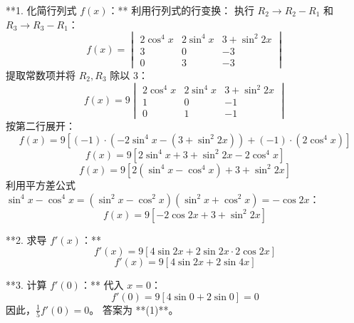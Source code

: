 \begin{questions}
\begin{solution}
**1. 化简行列式 $f(x)$：**
利用行列式的行变换：
执行 $R_2 \to R_2 - R_1$ 和 $R_3 \to R_3 - R_1$：
\[ f(x) = \begin{vmatrix} 2 \cos^4 x & 2 \sin^4 x & 3 + \sin^2 2x \\ 3 & 0 & -3 \\ 0 & 3 & -3 \end{vmatrix} \]
提取常数项并将 $R_2, R_3$ 除以 3：
\[ f(x) = 9 \begin{vmatrix} 2 \cos^4 x & 2 \sin^4 x & 3 + \sin^2 2x \\ 1 & 0 & -1 \\ 0 & 1 & -1 \end{vmatrix} \]
按第二行展开：
\[ f(x) = 9 [ (-1) \cdot (-2 \sin^4 x - (3 + \sin^2 2x)) + (-1) \cdot (2 \cos^4 x) ] \]
\[ f(x) = 9 [ 2 \sin^4 x + 3 + \sin^2 2x - 2 \cos^4 x ] \]
\[ f(x) = 9 [ 2 (\sin^4 x - \cos^4 x) + 3 + \sin^2 2x ] \]
利用平方差公式 $\sin^4 x - \cos^4 x = (\sin^2 x - \cos^2 x)(\sin^2 x + \cos^2 x) = -\cos 2x$：
\[ f(x) = 9 [ -2 \cos 2x + 3 + \sin^2 2x ] \]

**2. 求导 $f'(x)$：**
\[ f'(x) = 9 [ 4 \sin 2x + 2 \sin 2x \cdot 2 \cos 2x ] \]
\[ f'(x) = 9 [ 4 \sin 2x + 2 \sin 4x ] \]

**3. 计算 $f'(0)$：**
代入 $x = 0$：
\[ f'(0) = 9 [ 4 \sin 0 + 2 \sin 0 ] = 0 \]
因此，$\frac{1}{5} f'(0) = 0$。
答案为 **(1)**。
\end{solution}


\end{questions}
